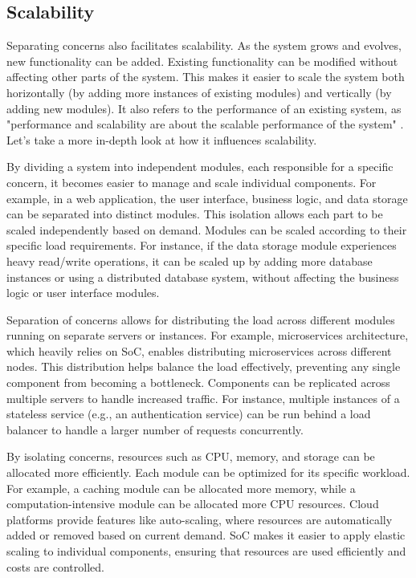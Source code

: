 \subsection{Scalability}
Separating concerns also facilitates scalability.
As the system grows and evolves, new functionality can be added. Existing functionality can be modified without affecting other parts of the system.
This makes it easier to scale the system both horizontally (by adding more instances of existing modules) and vertically (by adding new modules).
It also refers to the performance of an existing system, as "performance and scalability are about the scalable performance of the system" \cite{scalability}.
Let's take a more in-depth look at how it influences scalability.
\par
By dividing a system into independent modules, each responsible for a specific concern, it becomes easier to manage and scale individual components.
For example, in a web application, the user interface, business logic, and data storage can be separated into distinct modules.
This isolation allows each part to be scaled independently based on demand.
Modules can be scaled according to their specific load requirements.
For instance, if the data storage module experiences heavy read/write operations, it can be scaled up by adding more database instances or using a distributed database system, without affecting the business logic or user interface modules.
\par
Separation of concerns allows for distributing the load across different modules running on separate servers or instances.
For example, microservices architecture, which heavily relies on SoC, enables distributing microservices across different nodes.
This distribution helps balance the load effectively, preventing any single component from becoming a bottleneck.
Components can be replicated across multiple servers to handle increased traffic.
For instance, multiple instances of a stateless service (e.g., an authentication service) can be run behind a load balancer to handle a larger number of requests concurrently.
\par
By isolating concerns, resources such as CPU, memory, and storage can be allocated more efficiently.
Each module can be optimized for its specific workload.
For example, a caching module can be allocated more memory, while a computation-intensive module can be allocated more CPU resources.
Cloud platforms provide features like auto-scaling, where resources are automatically added or removed based on current demand.
SoC makes it easier to apply elastic scaling to individual components, ensuring that resources are used efficiently and costs are controlled.
